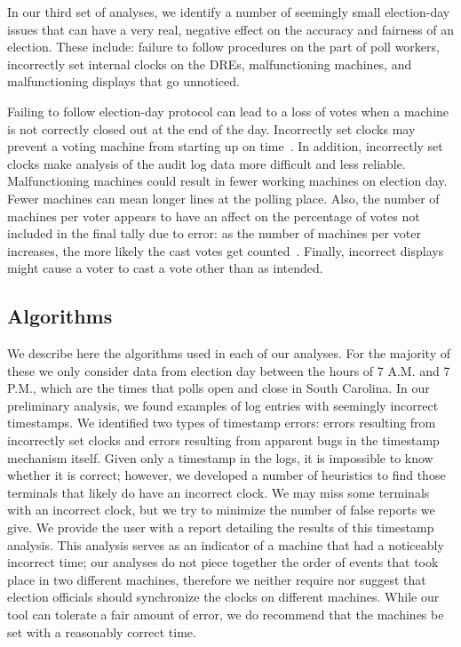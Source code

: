 \documentclass[letterpaper,twocolumn,10pt]{article}
\begin{document}

In our third set of analyses, we identify a number of seemingly small
election-day issues that can have a very real, negative effect on the accuracy
and fairness of an election. These include:
failure to follow procedures on the part of poll workers, incorrectly set
internal clocks on the DREs, malfunctioning machines, and malfunctioning
displays that go unnoticed.  

Failing to follow election-day protocol can lead to a loss of votes when a
machine is not correctly closed out at the end of the day. Incorrectly set
clocks may prevent a voting machine from starting up on
time~\cite{VotUn2007}. In addition, incorrectly set clocks make analysis of the
audit log data more difficult and less reliable. Malfunctioning machines could
result in fewer working machines on election day. Fewer machines can mean longer
lines at the polling place. Also, the number of machines per voter appears to have an 
affect on the percentage of votes not included in the final tally due to error: 
as the number of machines per voter increases, the more likely the cast votes 
get counted~\cite{DNC2005}. Finally,
incorrect displays might cause a voter to cast a vote other than as intended.
 
\subsection{Algorithms}
We describe here the algorithms used in each of our analyses. For the
majority of these we only consider data from election day between the hours of
7 A.M. and 7 P.M., which are the times that polls open and close in South
Carolina. In our preliminary analysis, we found examples of log entries with
seemingly incorrect timestamps. We identified two types of timestamp errors:
errors resulting from incorrectly set clocks and errors resulting from apparent
bugs in the timestamp mechanism itself. Given only a timestamp in the logs, it
is impossible to know whether it is correct; however, we developed a number of
heuristics to find those terminals that likely do have an incorrect clock. We
may miss some terminals with an incorrect clock, but we try to minimize the
number of false reports we give. We provide the user with a report detailing the
results of this timestamp analysis. This analysis serves as an indicator of a 
machine that had a noticeably incorrect time; our 
analyses do not piece together the order of events that took place in two 
different machines, therefore we neither require nor suggest that 
election officials should synchronize the clocks on different machines. While 
our tool can tolerate a fair amount of error, we do 
recommend that the machines be set with a reasonably correct time.
\end{document}
